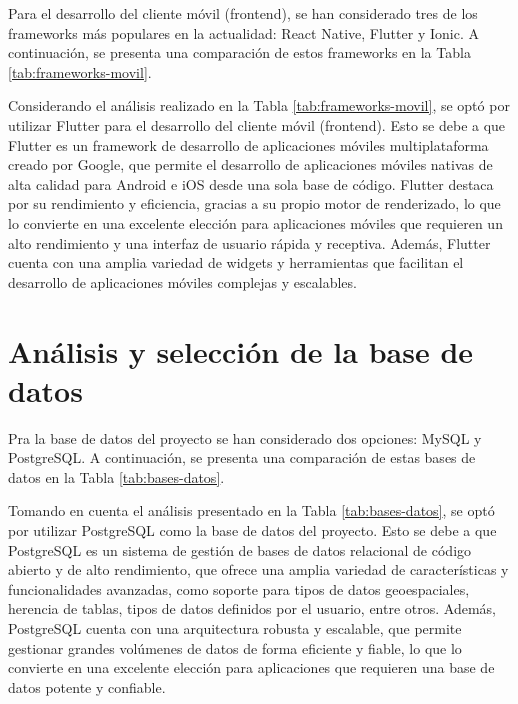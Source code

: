 Para el desarrollo del cliente móvil (frontend), se han considerado tres de los frameworks más populares en la
actualidad: React Native, Flutter y Ionic. A continuación, se presenta una comparación de estos frameworks en la
Tabla \ref{tab:frameworks-movil}.



Considerando el análisis realizado en la Tabla \ref{tab:frameworks-movil}, se optó por utilizar Flutter para el
desarrollo del cliente móvil (frontend). Esto se debe a que Flutter es un framework de desarrollo de aplicaciones
móviles multiplataforma creado por Google, que permite el desarrollo de aplicaciones móviles nativas de alta
calidad para Android e iOS desde una sola base de código. Flutter destaca por su rendimiento y eficiencia, gracias
a su propio motor de renderizado, lo que lo convierte en una excelente elección para aplicaciones móviles que
requieren un alto rendimiento y una interfaz de usuario rápida y receptiva. Además, Flutter cuenta con una amplia
variedad de widgets y herramientas que facilitan el desarrollo de aplicaciones móviles complejas y escalables.

\section{Análisis y selección de la base de datos}

Pra la base de datos del proyecto se han considerado dos opciones: MySQL y PostgreSQL. A continuación, se presenta
una comparación de estas bases de datos en la Tabla \ref{tab:bases-datos}.



Tomando en cuenta el análisis presentado en la Tabla \ref{tab:bases-datos}, se optó por utilizar PostgreSQL como
la base de datos del proyecto. Esto se debe a que PostgreSQL es un sistema de gestión de bases de datos relacional
de código abierto y de alto rendimiento, que ofrece una amplia variedad de características y funcionalidades
avanzadas, como soporte para tipos de datos geoespaciales, herencia de tablas, tipos de datos definidos por el
usuario, entre otros. Además, PostgreSQL cuenta con una arquitectura robusta y escalable, que permite gestionar
grandes volúmenes de datos de forma eficiente y fiable, lo que lo convierte en una excelente elección para
aplicaciones que requieren una base de datos potente y confiable.

